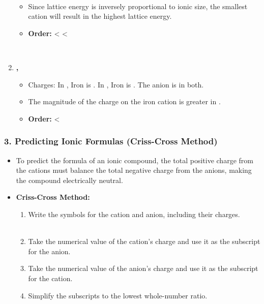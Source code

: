 \documentclass{article}
\begin{document}
\begin{enumerate}[itemsep=5pt]
\begin{itemize}
        \item Since lattice energy is inversely proportional to ionic size, the smallest cation will result in the highest lattice energy.
        \item \textbf{Order:}  <  < 
    \end{itemize}
    \item \textbf{, }
    \begin{itemize}
        \item Charges: In , Iron is . In , Iron is . The anion is  in both.
        \item The magnitude of the charge on the iron cation is greater in .
        \item \textbf{Order:}  < 
    \end{itemize}
\end{enumerate}

\bigskip
\subsubsection*{3. Predicting Ionic Formulas (Criss-Cross Method)}
\begin{itemize}[itemsep=5pt]
    \item To predict the formula of an ionic compound, the total positive charge from the cations must balance the total negative charge from the anions, making the compound electrically neutral.
    \item \textbf{Criss-Cross Method:}
    \begin{enumerate}
        \item Write the symbols for the cation and anion, including their charges.
        \item Take the numerical value of the cation's charge and use it as the subscript for the anion.
        \item Take the numerical value of the anion's charge and use it as the subscript for the cation.
        \item Simplify the subscripts to the lowest whole-number ratio.
    \end{enumerate}
\end{itemize}
\end{document}
